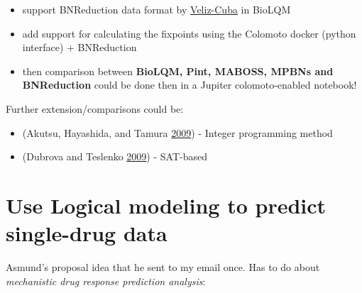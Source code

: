\documentclass[
  12pt,
]{book}
\providecommand{\tightlist}{%
  \setlength{\itemsep}{0pt}\setlength{\parskip}{0pt}}
\begin{document}
\begin{itemize}
\tightlist
\item
  support BNReduction data format by \href{https://doi.org/10.1186/1471-2105-15-221}{Veliz-Cuba}
  in BioLQM
\item
  add support for calculating the fixpoints using the Colomoto docker (python
  interface) + BNReduction
\item
  then comparison between \textbf{BioLQM, Pint, MABOSS, MPBNs and BNReduction} could be done then
  in a Jupiter colomoto-enabled notebook!
\end{itemize}

Further extension/comparisons could be:

\begin{itemize}
\tightlist
\item
  (Akutsu, Hayashida, and Tamura \protect\hyperlink{ref-Akutsu2009}{2009}) - Integer programming method
\item
  (Dubrova and Teslenko \protect\hyperlink{ref-Dubrova2009}{2009}) - SAT-based
\end{itemize}

\hypertarget{use-logical-modeling-to-predict-single-drug-data}{%
\section*{Use Logical modeling to predict single-drug data}\label{use-logical-modeling-to-predict-single-drug-data}}

Asmund's proposal idea that he sent to my email once.
Has to do about \emph{mechanistic drug response prediction analysis}:
\end{document}
